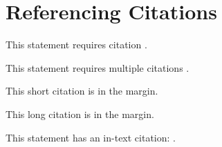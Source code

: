 \section{Referencing Citations}

This statement requires citation \autocite{Smith:2024jd}.

This statement requires multiple citations \autocite{Smith:2024jd, Smith:2023qr}.

This short citation is in the margin.

This long citation is in the margin.

This statement has an in-text citation: \textcite{Smith:2024jd}.